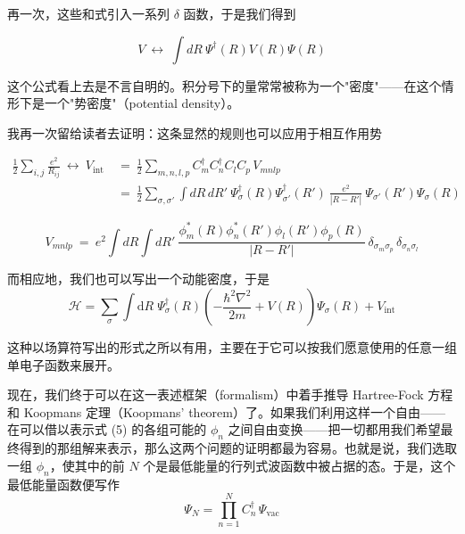 再一次，这些和式引入一系列 $\delta$ 函数，于是我们得到

\begin{equation*}
V\ \longleftrightarrow\ \int dR\ \Psi^{\dagger}(R)V(R)\Psi(R)
\end{equation*}

这个公式看上去是不言自明的。积分号下的量常常被称为一个"密度"——在这个情形下是一个"势密度"（potential density）。

我再一次留给读者去证明：这条显然的规则也可以应用于相互作用势

\begin{align*}
\frac{1}{2}\sum_{i,j}\frac{e^2}{R_{ij}}\ \longleftrightarrow\ V_{\mathrm{int}}\
&=\ \frac{1}{2}\sum_{m,n,l,p} C_m^{\dagger} C_n^{\dagger} C_l C_p\, V_{mnlp}\\
&=\ \frac{1}{2}\sum_{\sigma,\sigma'}\int dR\,dR'\ \Psi_{\sigma}^{\dagger}(R)\Psi_{\sigma'}^{\dagger}(R')\ \frac{e^2}{|R-R'|}\ \Psi_{\sigma'}(R')\Psi_{\sigma}(R)
\end{align*}

\begin{equation*}
V_{mnlp}\ =\ e^2\int dR\int dR'\ \frac{\phi_m^{*}(R)\phi_n^{*}(R')\phi_l(R')\phi_p(R)}{|R-R'|}\ \delta_{\sigma_m\sigma_p}\,\delta_{\sigma_n\sigma_l}
\tag{4}
\end{equation*}


而相应地，我们也可以写出一个动能密度，于是
\begin{equation*}
\mathcal{H} = \sum_{\sigma} \int \mathrm{d}R\;\Psi_{\sigma}^{\dagger}(R)\left(-\frac{\hbar^2\nabla^2}{2m} + V(R)\right)\Psi_{\sigma}(R) + V_{\mathrm{int}}
\tag{5}
\end{equation*}

这种以场算符写出的形式之所以有用，主要在于它可以按我们愿意使用的任意一组单电子函数来展开。

现在，我们终于可以在这一表述框架（formalism）中着手推导 Hartree-Fock 方程和 Koopmans 定理（Koopmans' theorem）了。如果我们利用这样一个自由——在可以借以表示式 (5) 的各组可能的 $\phi_n$ 之间自由变换——把一切都用我们希望最终得到的那组解来表示，那么这两个问题的证明都最为容易。也就是说，我们选取一组 $\phi_n$，使其中的前 $N$ 个是最低能量的行列式波函数中被占据的态。于是，这个最低能量函数便写作
\begin{equation*}
\Psi_N = \prod_{n=1}^{N} C_n^{\dagger}\,\Psi_{\mathrm{vac}}
\end{equation*}

